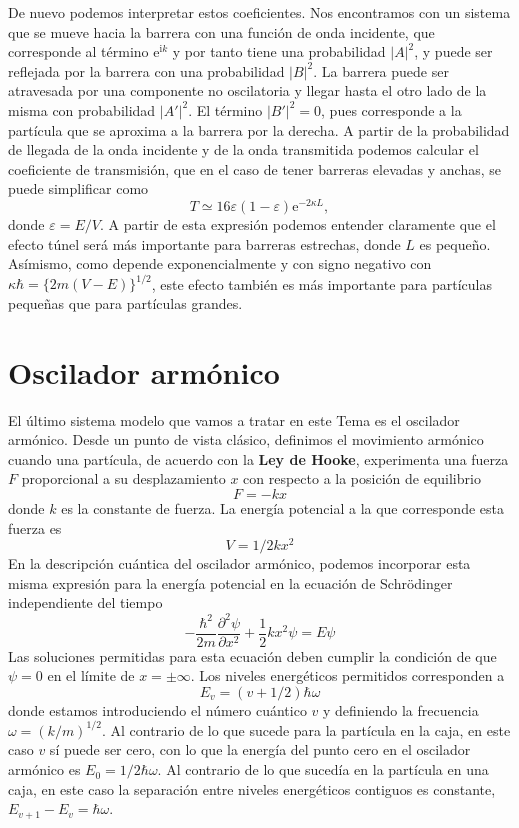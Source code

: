 De nuevo podemos interpretar estos coeficientes. Nos 
encontramos con un sistema que se mueve hacia la barrera
con una función de onda incidente, que corresponde al 
término $\mathrm{e}^{\mathrm{i}k}$ y por tanto tiene una
probabilidad $|A|^2$, y puede ser reflejada por la barrera 
con una probabilidad $|B|^2$. La barrera puede ser atravesada
por una componente no oscilatoria y llegar hasta el otro lado
de la misma con probabilidad $|A'|^2$. El término $|B'|^2=0$,
pues corresponde a la partícula que se aproxima a la barrera
por la derecha. A partir de la probabilidad de llegada de la
onda incidente y de la onda transmitida podemos calcular
el coeficiente de transmisión, que en el caso de tener barreras
elevadas y anchas, se puede simplificar como
\begin{equation}
    T\simeq 16\varepsilon(1-\varepsilon)\mathrm{e}^{-2\kappa L},
\end{equation}
donde $\varepsilon=E/V$. A partir de esta expresión podemos
entender claramente que el efecto túnel será más importante 
para barreras estrechas, donde $L$ es pequeño. Asímismo,
como depende exponencialmente y con signo negativo con 
$\kappa\hbar=\{2m(V-E)\}^{1/2}$, este efecto también es
más importante para partículas pequeñas que para partículas
grandes.

\section{Oscilador armónico}
El último sistema modelo que vamos a tratar en este Tema es
el oscilador armónico. Desde un punto de vista clásico, 
definimos el movimiento armónico cuando una partícula,
de acuerdo con la \textbf{Ley de Hooke}, experimenta una fuerza $F$ proporcional a su desplazamiento $x$ con 
respecto a la posición de equilibrio
\begin{equation}
    F=-kx
\end{equation}
donde $k$ es la constante de fuerza. La energía potencial 
a la que corresponde esta fuerza es
\begin{equation}
    V= 1/2kx^2
\end{equation}
En la descripción cuántica del oscilador armónico, podemos 
incorporar esta misma expresión para la energía potencial
en la ecuación de Schrödinger independiente del tiempo
\begin{equation}
    -\frac{\hbar^2}{2m}\frac{\partial^2\psi}{\partial x^2}
    + \frac{1}{2}kx^2\psi=E\psi \label{eq:schrodinger_ho}
\end{equation}
Las soluciones permitidas para esta ecuación deben cumplir
la condición de que $\psi=0$ en el límite de $x=\pm\infty$.
Los niveles energéticos permitidos corresponden a 
\begin{equation}
    E_v=(v+1/2)\hbar\omega
\end{equation}
donde estamos introduciendo el número cuántico $v$ y 
definiendo la frecuencia $\omega=(k/m)^{1/2}$. Al contrario
de lo que sucede para la partícula en la caja, en este 
caso $v$ sí puede ser cero, con lo que la energía del punto
cero en el oscilador armónico es $E_0=1/2\hbar\omega$. Al
contrario de lo que sucedía en la partícula en una caja, 
en este caso la separación entre niveles energéticos 
contiguos es constante, $E_{v+1}-E_{v}=\hbar\omega$.

